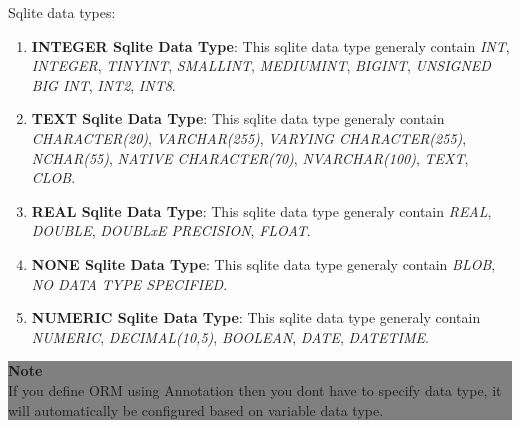 \par
Sqlite data types:
	
\begin{enumerate}

	\item \small \textbf{INTEGER Sqlite Data Type}: This sqlite data type generaly contain \textit{INT}, \textit{INTEGER}, \textit{TINYINT}, \textit{SMALLINT}, \textit{MEDIUMINT}, \textit{BIGINT}, \textit{UNSIGNED BIG INT}, \textit{INT2}, \textit{INT8}.
	
	\item \small \textbf{TEXT Sqlite Data Type}: This sqlite data type generaly contain \textit{CHARACTER(20)}, \textit{VARCHAR(255)}, \textit{VARYING CHARACTER(255)}, \textit{NCHAR(55)}, \textit{NATIVE CHARACTER(70)}, \textit{NVARCHAR(100)}, \textit{TEXT}, \textit{CLOB}.

	\item \small \textbf{REAL Sqlite Data Type}: This sqlite data type generaly contain \textit{REAL}, \textit{DOUBLE}, \textit{DOUBLxE PRECISION}, \textit{FLOAT}.
	
	\item \small \textbf{NONE Sqlite Data Type}: This sqlite data type generaly contain \textit{BLOB}, \textit{NO DATA TYPE SPECIFIED}.

	\item \small \textbf{NUMERIC Sqlite Data Type}: This sqlite data type generaly contain \textit{NUMERIC}, \textit{DECIMAL(10,5)}, \textit{BOOLEAN}, \textit{DATE}, \textit{DATETIME}.

\end{enumerate}


					\begin{center}
						\colorbox{grey}{
						\parbox[t]{.8\linewidth}{
							\fontsize{11pt}{11pt}\selectfont %
							\vspace*{0.1cm} %
		
							\hfill \textbf{Note} \\
							If you define ORM using Annotation then you dont have to specify data type, it will automatically be configured based on variable data type.
				
							\vspace*{0.0cm} %
						}
					}

					\end{center}



